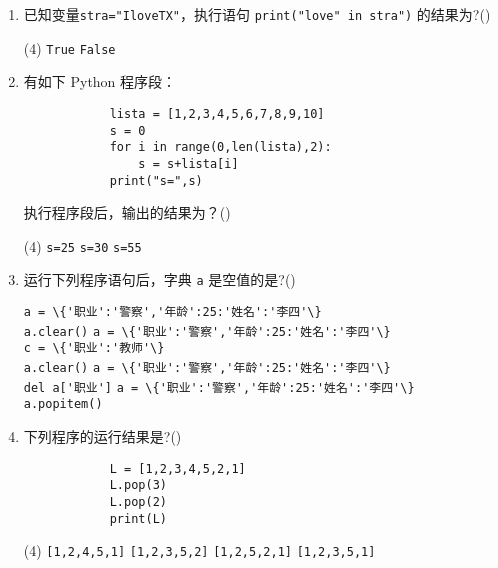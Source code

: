 \documentclass[11pt]{ctexart}
\begin{document}
\begin{enumerate}
        \item 已知变量\lstinline!stra="IloveTX"!，执行语句 \lstinline!print("love" in stra")! 的结果为?(\qquad)
        \begin{tasks}(4)
            \task \lstinline!True!
            \task \lstinline!False!
        \end{tasks}

        \item 有如下 Python 程序段：
        \begin{lstlisting}
            lista = [1,2,3,4,5,6,7,8,9,10]
            s = 0
            for i in range(0,len(lista),2):    
                s = s+lista[i]
            print("s=",s)
        \end{lstlisting}
        执行程序段后，输出的结果为？(\qquad)
        \begin{tasks}(4)
            \task \lstinline!s=25!
            \task \lstinline!s=30!
            \task \lstinline!s=55!
        \end{tasks}

        \newpage
        \item 运行下列程序语句后，字典 \lstinline{a} 是空值的是?(\qquad)
        \begin{tasks}
            \task \lstinline!a = \{'职业':'警察','年龄':25:'姓名':'李四'\}!\\
                  \lstinline!a.clear()!
            \task \lstinline!a = \{'职业':'警察','年龄':25:'姓名':'李四'\}!\\
                  \lstinline!c = \{'职业':'教师'\}!\\       
                  \lstinline!a.clear()!
            \task \lstinline!a = \{'职业':'警察','年龄':25:'姓名':'李四'\}!\\
                  \lstinline!del a['职业']!
            \task \lstinline!a = \{'职业':'警察','年龄':25:'姓名':'李四'\}!\\
                  \lstinline!a.popitem()!
        \end{tasks}

        \item 下列程序的运行结果是?(\qquad)
        \begin{lstlisting}
            L = [1,2,3,4,5,2,1]
            L.pop(3)
            L.pop(2)
            print(L)
        \end{lstlisting}
        \begin{tasks}(4)
            \task \lstinline![1,2,4,5,1]!
            \task \lstinline![1,2,3,5,2]!
            \task \lstinline![1,2,5,2,1]!
            \task \lstinline![1,2,3,5,1]!
        \end{tasks}


\end{enumerate}
\end{document}
